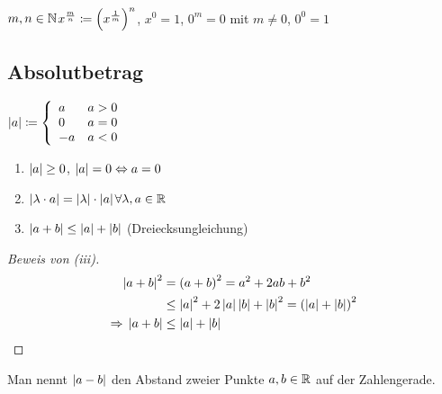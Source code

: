 \begin{definition}
    $m,n\in\mathbb{N}$\quad $x^\frac{m}{n}\coloneqq \left(x^\frac{1}{m}\right)^n$, $x^0 = 1$, $0^m = 0$ mit $m\neq 0$, $0^0 = 1$
\end{definition}

\subsection{Absolutbetrag}

\begin{definition}[Betrag]
    $\left|a\right| \coloneqq \left\{ \begin{array}{lr}
                                    a  & a>0 \\
                                    0  & a=0 \\
                                    -a & a<0
    \end{array}\right.$
\end{definition}

\begin{satz}
    \theoremescape
    \begin{enumerate}[label=(\roman*)]
        \item $\left|a\right| \geq 0$, $\left|a\right| = 0 \Leftrightarrow{} a = 0$
        \item $\left|\lambda\cdot a\right| = \left|\lambda\right|\cdot\left|a\right|$\quad $\forall \lambda, a \in \mathbb{R}$
        \item $\left|a+b\right|\leq \left|a\right|+\left|b\right|$ (Dreiecksungleichung) %
    \end{enumerate}
    \begin{proof}[Beweis von (iii)]
        \begin{align*}
            \left|a+b\right|^2 &= \left(a+b\right)^2 = a^2 + 2ab + b^2\\
            &\leq \left|a\right|^2 + 2\left|a\right|\left|b\right| + \left|b\right|^2 = \left(\left|a\right|+\left|b\right|\right)^2\\
            \Rightarrow{} \left|a+b\right|&\leq\left|a\right|+\left|b\right|\qedhere
        \end{align*}
    \end{proof}
\end{satz}

\begin{definition}
    Man nennt $\left|a-b\right|$ den Abstand zweier Punkte $a,b\in\mathbb{R}$ auf der Zahlengerade.
\end{definition}

